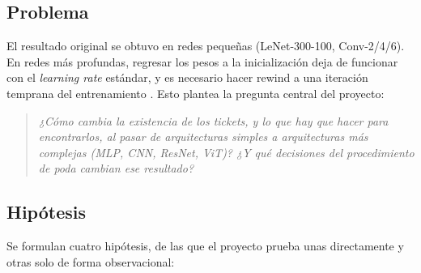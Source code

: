 \documentclass[11pt]{article}
\begin{document}
\subsection{Problema}
El resultado original se obtuvo en redes pequeñas (LeNet-300-100, Conv-2/4/6). En redes más profundas, regresar los pesos a la inicialización deja de funcionar con el \textit{learning rate} estándar, y es necesario hacer rewind a una iteración temprana del entrenamiento \cite{frankle2019stabilizing}. Esto plantea la pregunta central del proyecto:

\begin{quote}
\textit{¿Cómo cambia la existencia de los tickets, y lo que hay que hacer para encontrarlos, al pasar de arquitecturas simples a arquitecturas más complejas (MLP, CNN, ResNet, ViT)? ¿Y qué decisiones del procedimiento de poda cambian ese resultado?}
\end{quote}

\subsection{Hipótesis}
Se formulan cuatro hipótesis, de las que el proyecto prueba unas directamente y otras solo de forma observacional:
\end{document}
